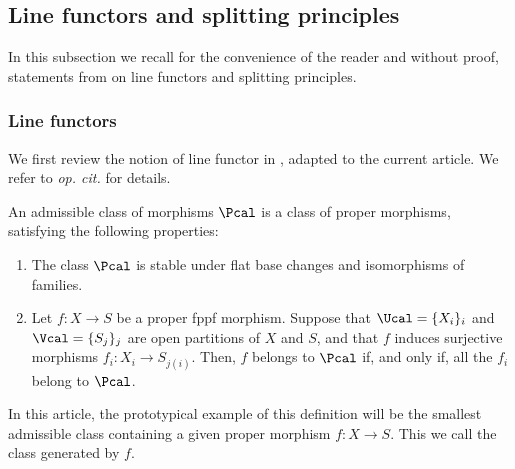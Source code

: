 \subsection{Line functors and splitting principles}\label{subsubsec:line-functors}
In this subsection we recall for the convenience of the reader and without proof, statements from \cite[\S 2]{Eriksson-Freixas-Wentworth} on line functors and splitting principles.

\subsubsection{Line functors}
We first review the notion of line functor in \cite[Def.\,2.1]{Eriksson-Freixas-Wentworth}, adapted to the current article. We refer to \emph{op. cit.} for details.

\begin{definition}\label{def:admissible-class}
An admissible class of morphisms $\Pcal$ is a class of proper \fppf morphisms, satisfying the following properties:
\begin{enumerate}
\item[$(P_1)$] The class $\Pcal$ is stable under flat base changes and isomorphisms of families.
\item[$(P_2)$] Let $f\colon X\to S$ be a proper fppf morphism. Suppose that $\Ucal=\lbrace X_{i}\rbrace_{i}$ and $\Vcal=\lbrace S_{j}\rbrace_{j}$ are open partitions of $X$ and $S$, and that $f$ induces surjective morphisms $f_{i}\colon X_{i}\to S_{j(i)}$. Then, $f$ belongs to $\Pcal$ if, and only if, all the $f_{i}$ belong to $\Pcal$.
\end{enumerate}

\end{definition}
In this article, the prototypical example of this definition will be the smallest admissible class containing a given proper \fppf morphism $f\colon X\to S$. This we call the class generated by $f$.

